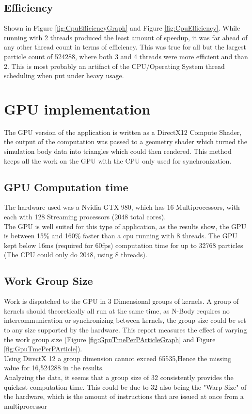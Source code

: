 \documentclass[conference]{acmsiggraph}
\begin{document}
\subsection{Efficiency}
Shown in Figure \ref{fig:CpuEfficiencyGraph} and Figure \ref{fig:CpuEfficiency}.
While running with 2 threads produced the least amount of speedup, it was far ahead of any other thread count in terms of efficiency. This was true for all but the largest particle count of 524288, where both 3 and 4 threads were more efficient and than 2. This is most probably an artifact of the CPU/Operating System thread scheduling when put under heavy usage.

\section{GPU implementation}
The GPU version of the application is written as a DirectX12 Compute Shader, the output of the computation was passed to a geometry shader which turned the simulation body data into triangles which could then rendered. This method keeps all the work on the GPU with the CPU only used for synchronization. 

\subsection{GPU Computation time}
The hardware used was a Nvidia GTX 980, which has 16 Multiprocessors, with each with 128 Streaming processors (2048 total cores).\\
The GPU is well suited for this type of application, as the results show, the GPU is between 15\% and 160\% faster than a cpu running with 8 threads. The GPU kept below 16ms (required for 60fps) computation time for up to 32768 particles (The CPU could only do 2048, using 8 threads).

\subsection{Work Group Size}
Work is dispatched to the GPU in 3 Dimensional groups of kernels. 
A group of kernels should theoretically all run at the same time, as N-Body requires no intercommunication or synchronizing between kernels, the group size could be set to any size supported by the hardware.
This report measures the effect of varying the work group size (Figure \ref{fig:GpuTmePerPArticleGraph} and Figure \ref{fig:GpuTmePerPArticle}).
\\ 
Using DirectX 12 a group dimension cannot exceed 65535,Hence the missing value for 16,524288 in the results.
\\
Analyzing the data, it seems that a group size of 32 consistently provides the quickest computation time. This could be due to 32 also being the "Warp Size" of the hardware, which is the amount of instructions that are issued at once from a multiprocessor
\end{document}
